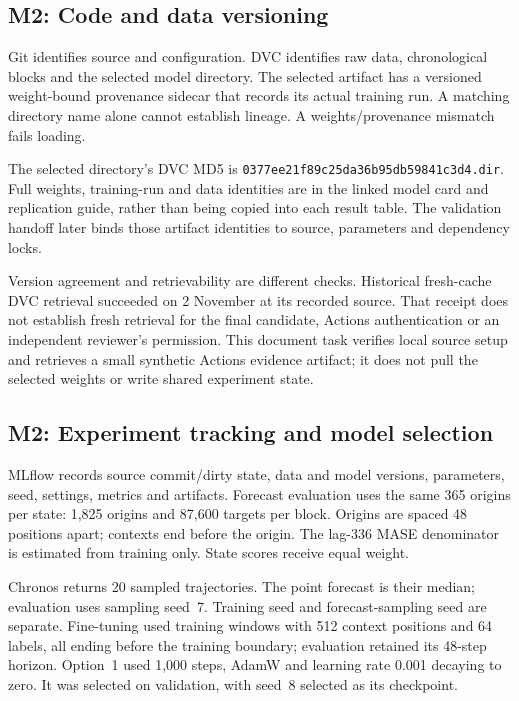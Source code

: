 \documentclass[a4paper,11pt]{article}
\begin{document}
\subsection{M2: Code and data versioning}

Git identifies source and configuration. DVC identifies raw data, chronological
blocks and the selected model directory. The selected artifact has a versioned
weight-bound provenance sidecar that records its actual training run. A matching
directory name alone cannot establish lineage. A weights/provenance mismatch
fails loading.

The selected directory's DVC MD5 is
\texttt{0377ee21f89c25da36b95db59841c3d4.dir}. Full weights, training-run and data
identities are in the linked model card and replication guide, rather than being
copied into each result table. The validation handoff later binds those artifact
identities to source, parameters and dependency locks.

Version agreement and retrievability are different checks. Historical fresh-cache
DVC retrieval succeeded on 2 November at its recorded source. That receipt does
not establish fresh retrieval for the final candidate, Actions authentication or
an independent reviewer's permission. This document task verifies local source
setup and retrieves a small synthetic Actions evidence artifact; it does not pull
the selected weights or write shared experiment state.

\subsection{M2: Experiment tracking and model selection}

MLflow records source commit/dirty state, data and model versions, parameters,
seed, settings, metrics and artifacts. Forecast evaluation uses the same 365
origins per state: 1,825 origins and 87,600 targets per block. Origins are spaced
48 positions apart; contexts end before the origin. The lag-336 MASE denominator
is estimated from training only. State scores receive equal weight.

Chronos returns 20 sampled trajectories. The point forecast is their median;
evaluation uses sampling seed~7. Training seed and forecast-sampling seed are
separate. Fine-tuning used training windows with 512 context positions and 64
labels, all ending before the training boundary; evaluation retained its 48-step
horizon. Option~1 used 1,000 steps, AdamW and learning rate 0.001 decaying to zero.
It was selected on validation, with seed~8 selected as its checkpoint.
\end{document}
